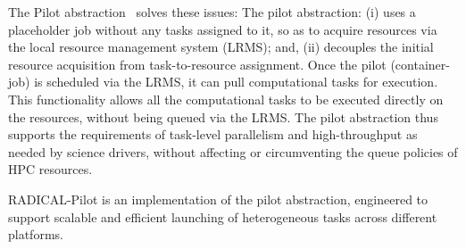 The Pilot abstraction~\cite{turilli2017comprehensive} solves these issues:
The pilot abstraction: (i) uses a placeholder job without any tasks assigned
to it, so as to acquire resources via the local resource management system
(LRMS); and, (ii) decouples the initial resource acquisition from
task-to-resource assignment. Once the pilot (container-job) is scheduled via
the LRMS, it can pull computational tasks for execution. This functionality
allows all the computational tasks to be executed directly on the resources,
without being queued via the LRMS\@. %
The pilot abstraction thus supports the requirements of task-level
parallelism and high-throughput as needed by science drivers, without
affecting or circumventing the queue policies of HPC resources.

RADICAL-Pilot is an implementation of the pilot abstraction, engineered to
support scalable and efficient launching of heterogeneous tasks across
different platforms.